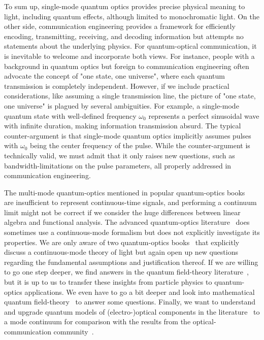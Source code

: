To sum up, single-mode quantum optics provides precise physical meaning to light, including quantum effects, although limited to monochromatic light.
On the other side, communication engineering provides a framework for efficiently encoding, transmitting, receiving, and decoding information but attempts no statements about the underlying physics.
For quantum-optical communication, it is inevitable to welcome and incorporate both views.
For instance, people with a background in quantum optics but foreign to communication engineering often advocate the concept of "one state, one universe", where each quantum transmission is completely independent.
However, if we include practical considerations, like assuming a single transmission line, the picture of "one state, one universe" is plagued by several ambiguities.
For example, a single-mode quantum state with well-defined frequency $\omega_0$ represents a perfect sinusoidal wave with infinite duration, making information transmission absurd.
The typical counter-argument is that single-mode quantum optics implicitly assumes pulses with $\omega_0$ being the center frequency of the pulse.
While the counter-argument is technically valid, we must admit that it only raises new questions, such as bandwidth-limitations on the pulse parameters, all properly addressed in communication engineering.

The multi-mode quantum-optics mentioned in popular quantum-optics books~\cite{Gerry2005,Fox2006} are insufficient to represent continuous-time signals, and performing a continuum limit might not be correct if we consider the huge differences between linear algebra and functional analysis.
The advanced quantum-optics literature~\cite{Vogel2006,Mandel1995} does sometimes use a continuous-mode formalism but does not explicitly investigate its properties.
We are only aware of two quantum-optics books~\cite{Loudon2000,Barnett2002} that explicitly discuss a continuous-mode theory of light but again open up new questions regarding the fundamental assumptions and justification thereof.
If we are willing to go one step deeper, we find answers in the quantum field-theory literature~\cite{Peskin1995,Srednicki2007,Greiner2013,Itzykson2012}, but it is up to us to transfer these insights from particle physics to quantum-optics applications.
We even have to go a bit deeper and look into mathematical quantum field-theory~\cite{Streater2016,Bogoliubov1982,Bogolubov1989} to answer some questions.
Finally, we want to understand and upgrade quantum models of (electro-)optical components in the literature~\cite{Vogel2006,Leonhardt2003,Haroche2006,Mandel1995} to a mode continuum for comparison with the results from the optical-communication community~\cite{Shapiro2009,Kikuchi2016}.

